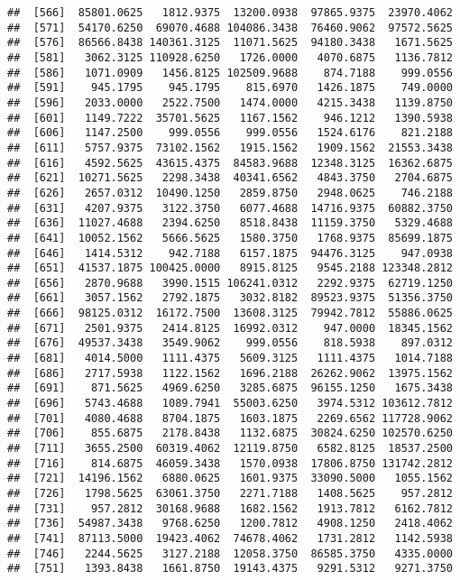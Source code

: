 \documentclass[]{article}
\begin{document}
\begin{verbatim}
##  [566]  85801.0625   1812.9375  13200.0938  97865.9375  23970.4062
##  [571]  54170.6250  69070.4688 104086.3438  76460.9062  97572.5625
##  [576]  86566.8438 140361.3125  11071.5625  94180.3438   1671.5625
##  [581]   3062.3125 110928.6250   1726.0000   4070.6875   1136.7812
##  [586]   1071.0909   1456.8125 102509.9688    874.7188    999.0556
##  [591]    945.1795    945.1795    815.6970   1426.1875    749.0000
##  [596]   2033.0000   2522.7500   1474.0000   4215.3438   1139.8750
##  [601]   1149.7222  35701.5625   1167.1562    946.1212   1390.5938
##  [606]   1147.2500    999.0556    999.0556   1524.6176    821.2188
##  [611]   5757.9375  73102.1562   1915.1562   1909.1562  21553.3438
##  [616]   4592.5625  43615.4375  84583.9688  12348.3125  16362.6875
##  [621]  10271.5625   2298.3438  40341.6562   4843.3750   2704.6875
##  [626]   2657.0312  10490.1250   2859.8750   2948.0625    746.2188
##  [631]   4207.9375   3122.3750   6077.4688  14716.9375  60882.3750
##  [636]  11027.4688   2394.6250   8518.8438  11159.3750   5329.4688
##  [641]  10052.1562   5666.5625   1580.3750   1768.9375  85699.1875
##  [646]   1414.5312    942.7188   6157.1875  94476.3125    947.0938
##  [651]  41537.1875 100425.0000   8915.8125   9545.2188 123348.2812
##  [656]   2870.9688   3990.1515 106241.0312   2292.9375  62719.1250
##  [661]   3057.1562   2792.1875   3032.8182  89523.9375  51356.3750
##  [666]  98125.0312  16172.7500  13608.3125  79942.7812  55886.0625
##  [671]   2501.9375   2414.8125  16992.0312    947.0000  18345.1562
##  [676]  49537.3438   3549.9062    999.0556    818.5938    897.0312
##  [681]   4014.5000   1111.4375   5609.3125   1111.4375   1014.7188
##  [686]   2717.5938   1122.1562   1696.2188  26262.9062  13975.1562
##  [691]    871.5625   4969.6250   3285.6875  96155.1250   1675.3438
##  [696]   5743.4688   1089.7941  55003.6250   3974.5312 103612.7812
##  [701]   4080.4688   8704.1875   1603.1875   2269.6562 117728.9062
##  [706]    855.6875   2178.8438   1132.6875  30824.6250 102570.6250
##  [711]   3655.2500  60319.4062  12119.8750   6582.8125  18537.2500
##  [716]    814.6875  46059.3438   1570.0938  17806.8750 131742.2812
##  [721]  14196.1562   6880.0625   1601.9375  33090.5000   1055.1562
##  [726]   1798.5625  63061.3750   2271.7188   1408.5625    957.2812
##  [731]    957.2812  30168.9688   1682.1562   1913.7812   6162.7812
##  [736]  54987.3438   9768.6250   1200.7812   4908.1250   2418.4062
##  [741]  87113.5000  19423.4062  74678.4062   1731.2812   1142.5938
##  [746]   2244.5625   3127.2188  12058.3750  86585.3750   4335.0000
##  [751]   1393.8438   1661.8750  19143.4375   9291.5312   9271.3750

\end{verbatim}
\end{document}
